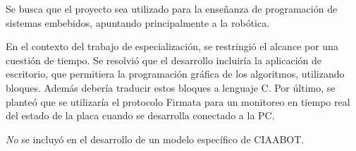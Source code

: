 Se busca que el proyecto sea utilizado para la enseñanza de programación de sistemas embebidos, apuntando principalmente a la robótica.

En el contexto del trabajo de especialización, se restringió el alcance por una cuestión de tiempo. Se resolvió que el desarrollo incluiría la aplicación de escritorio, que permitiera la programación gráfica de los algoritmos, utilizando bloques. Además debería traducir estos bloques a lenguaje C. Por último, se planteó que se utilizaría el protocolo Firmata para un monitoreo en tiempo real del estado de la placa cuando se desarrolla conectado a la PC.

\emph{No} se incluyó en el desarrollo de un modelo específico de CIAABOT.
